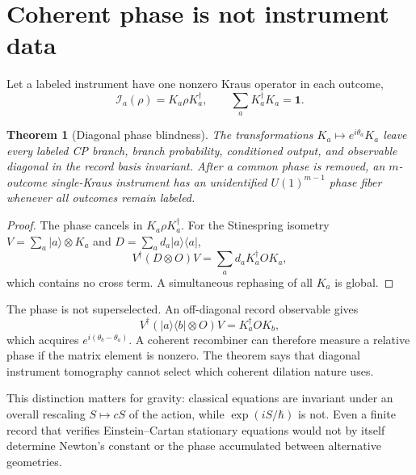 \documentclass[11pt]{article}
\newtheorem{theorem}{Theorem}[section]
\theoremstyle{remark}
\newcommand{\id}{\mathbf 1}
\begin{document}
\section{Coherent phase is not instrument data}

Let a labeled instrument have one nonzero Kraus operator in each outcome,
\begin{equation}
 \mathcal I_a(\rho)=K_a\rho K_a^\dagger,\qquad
 \sum_aK_a^\dagger K_a=\id.
 \label{eq:labeled-instrument}
\end{equation}

\begin{theorem}[Diagonal phase blindness]
\label{thm:phase-blindness}
The transformations $K_a\mapsto e^{i\theta_a}K_a$ leave every labeled CP branch, branch
probability, conditioned output, and observable diagonal in the record basis invariant.
After a common phase is removed, an $m$-outcome single-Kraus instrument has an
unidentified $U(1)^{m-1}$ phase fiber whenever all outcomes remain labeled.
\end{theorem}

\begin{proof}
The phase cancels in $K_a\rho K_a^\dagger$.  For the Stinespring isometry
$V=\sum_a|a\rangle\otimes K_a$ and $D=\sum_ad_a|a\rangle\langle a|$,
\begin{equation}
 V^\dagger(D\otimes O)V=\sum_ad_aK_a^\dagger OK_a,
 \label{eq:diagonal-record}
\end{equation}
which contains no cross term.  A simultaneous rephasing of all $K_a$ is global.
\end{proof}

The phase is not superselected.  An off-diagonal record observable gives
\begin{equation}
 V^\dagger(|a\rangle\langle b|\otimes O)V=K_a^\dagger OK_b,
 \label{eq:coherent-record}
\end{equation}
which acquires $e^{i(\theta_b-\theta_a)}$.  A coherent recombiner can therefore measure a
relative phase if the matrix element is nonzero.  The theorem says that diagonal
instrument tomography cannot select which coherent dilation nature uses.

This distinction matters for gravity: classical equations are invariant under an overall
rescaling $S\mapsto cS$ of the action, while $\exp(iS/\hbar)$ is not.  Even a finite record
that verifies Einstein--Cartan stationary equations would not by itself determine Newton's
constant or the phase accumulated between alternative geometries.
\end{document}
